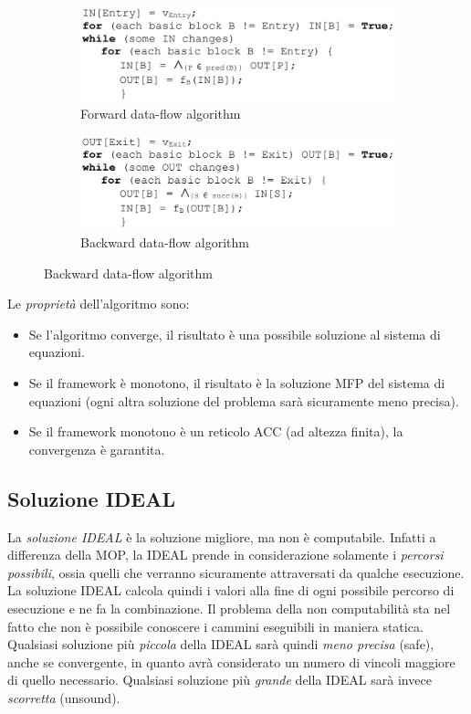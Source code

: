 \documentclass[a4paper,oneside,titlepage]{book}
\begin{document}
\begin{figure}[htp]
	\begin{subfigure}{0.49\textwidth}
	    \centering
		\includegraphics[width=\textwidth, height=\textheight, keepaspectratio]{fwAlg.png}
		\caption{Forward data-flow algorithm}
	\end{subfigure}
	\hfill
	\begin{subfigure}{0.49\textwidth}
	    \centering
		\includegraphics[width=\textwidth, height=\textheight, keepaspectratio]{bwAlg.png} 
		\caption{Backward data-flow algorithm}
	\end{subfigure}
\end{figure}
Le \textit{proprietà} dell'algoritmo sono:
\begin{itemize}
    \item Se l'algoritmo converge, il risultato è una possibile soluzione al sistema di equazioni.
    \item Se il framework è monotono, il risultato è la soluzione MFP del sistema di equazioni (ogni altra soluzione del problema sarà sicuramente meno precisa).
    \item Se il framework monotono è un reticolo ACC (ad altezza finita), la convergenza è garantita.
\end{itemize}

\subsection{Soluzione IDEAL}
La \textit{soluzione IDEAL} è la soluzione migliore, ma non è computabile. Infatti a differenza della MOP, la IDEAL prende in considerazione solamente i \textit{percorsi possibili}, ossia quelli che verranno sicuramente attraversati da qualche esecuzione. La soluzione IDEAL calcola quindi i valori alla fine di ogni possibile percorso di esecuzione e ne fa la combinazione. Il problema della non computabilità sta nel fatto che non è possibile conoscere i cammini eseguibili in maniera statica. Qualsiasi soluzione più \textit{piccola} della IDEAL sarà quindi \textit{meno precisa} (safe), anche se convergente, in quanto avrà considerato un numero di vincoli maggiore di quello necessario. Qualsiasi soluzione più \textit{grande} della IDEAL sarà invece \textit{scorretta} (unsound).
\end{document}
